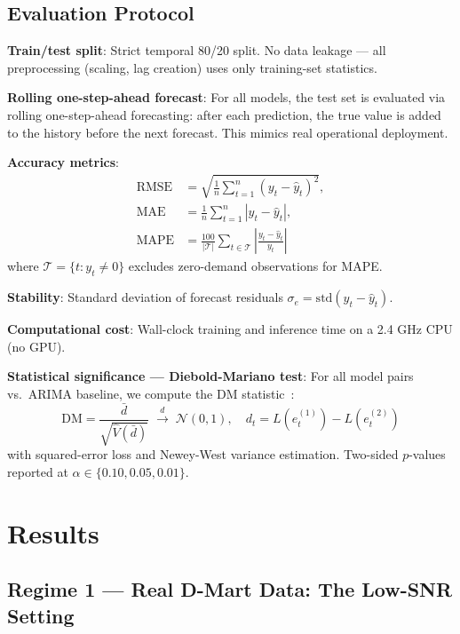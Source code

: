 \documentclass[journal]{IEEEtran}
\begin{document}
\subsection{Evaluation Protocol}
\label{sec:eval}

\textbf{Train/test split}: Strict temporal 80/20 split. No data leakage — all preprocessing (scaling, lag creation) uses only training-set statistics.

\textbf{Rolling one-step-ahead forecast}: For all models, the test set is evaluated via rolling one-step-ahead forecasting: after each prediction, the true value is added to the history before the next forecast. This mimics real operational deployment.

\textbf{Accuracy metrics}:
\begin{align}
  \text{RMSE} &= \sqrt{\tfrac{1}{n}\textstyle\sum_{t=1}^n (y_t - \hat{y}_t)^2}, \\
  \text{MAE}  &= \tfrac{1}{n}\textstyle\sum_{t=1}^n |y_t - \hat{y}_t|, \\
  \text{MAPE} &= \tfrac{100}{|\mathcal{T}|}\textstyle\sum_{t\in\mathcal{T}} \left|\tfrac{y_t - \hat{y}_t}{y_t}\right|
\end{align}
where $\mathcal{T}=\{t:y_t\neq 0\}$ excludes zero-demand observations for MAPE.

\textbf{Stability}: Standard deviation of forecast residuals $\sigma_e = \mathrm{std}(y_t - \hat{y}_t)$.

\textbf{Computational cost}: Wall-clock training and inference time on a 2.4 GHz CPU (no GPU).

\textbf{Statistical significance — Diebold-Mariano test}: For all model pairs vs.\ ARIMA baseline, we compute the DM statistic~\cite{diebold1995comparing}:
\begin{equation}
  \mathrm{DM} = \frac{\bar{d}}{\sqrt{\hat{V}(\bar{d})}} \;\xrightarrow{d}\; \mathcal{N}(0,1), \quad d_t = L(e^{(1)}_t) - L(e^{(2)}_t)
\end{equation}
with squared-error loss and Newey-West variance estimation. Two-sided $p$-values reported at $\alpha\in\{0.10, 0.05, 0.01\}$.

\section{Results}
\label{sec:results}

\subsection{Regime 1 — Real D-Mart Data: The Low-SNR Setting}
\end{document}

